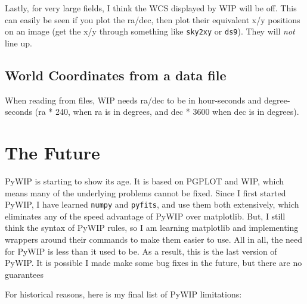 \documentclass[12pt]{article}
\newcommand{\pywip}{PyWIP}
\begin{document}
Lastly, for very large fields, I think the WCS displayed by WIP will be off. 
This can easily be seen if you plot the ra/dec, then plot their equivalent x/y
positions on an image (get the x/y through something like \texttt{sky2xy} or
\texttt{ds9}). They will \emph{not} line up.

\subsection{World Coordinates from a data file}

When reading from files, WIP needs ra/dec to be in hour-seconds and 
degree-seconds (ra * 240, when ra is in degrees, and dec * 3600 when dec is
in degrees).

\section{The Future}

\pywip{} is starting to show its age.  It is based on PGPLOT and WIP, which
means many of the underlying problems cannot be fixed.  Since I first started
\pywip, I have learned \texttt{numpy} and \texttt{pyfits}, and use them both
extensively, which eliminates any of the speed advantage of \pywip{} over
matplotlib.  But, I still think the syntax of \pywip{} rules, so I am learning
matplotlib and implementing wrappers around their commands to make them easier
to use.  All in all, the need for \pywip{} is less than it used to be. As a
result, this is the last version of \pywip.  It is possible I made make some bug
fixes in the future, but there are no guarantees

For historical reasons, here is my final list of \pywip{} limitations:
\end{document}
